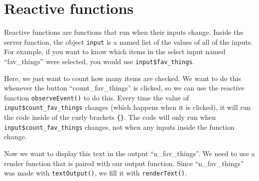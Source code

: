 \documentclass[
]{book}
\newenvironment{Shaded}{\begin{snugshade}}{\end{snugshade}}
\newcommand{\CommentTok}[1]{\textcolor[rgb]{0.56,0.35,0.01}{\textit{#1}}}
\newcommand{\ControlFlowTok}[1]{\textcolor[rgb]{0.13,0.29,0.53}{\textbf{#1}}}
\newcommand{\FunctionTok}[1]{\textcolor[rgb]{0.00,0.00,0.00}{#1}}
\newcommand{\NormalTok}[1]{#1}
\newcommand{\OtherTok}[1]{\textcolor[rgb]{0.56,0.35,0.01}{#1}}
\newcommand{\SpecialCharTok}[1]{\textcolor[rgb]{0.00,0.00,0.00}{#1}}
\newcommand{\StringTok}[1]{\textcolor[rgb]{0.31,0.60,0.02}{#1}}
\begin{document}
\hypertarget{first-reactive}{%
\section{Reactive functions}\label{first-reactive}}

Reactive functions are functions that run when their inputs change. Inside the server function, the object \texttt{input} is a named list of the values of all of the inputs. For example, if you want to know which items in the select input named ``fav\_things'' were selected, you would use \texttt{input\$fav\_things}.

Here, we just want to count how many items are checked. We want to do this whenever the button ``count\_fav\_things'' is clicked, so we can use the reactive function \texttt{observeEvent()} to do this. Every time the value of \texttt{input\$count\_fav\_things} changes (which happens when it is clicked), it will run the code inside of the curly brackets \texttt{\{\}}. The code will only run when \texttt{input\$count\_fav\_things} changes, not when any inputs inside the function change.

\begin{Shaded}
\end{Shaded}

Now we want to display this text in the output ``n\_fav\_things''. We need to use a render function that is paired with our output function. Since ``n\_fav\_things'' was made with \texttt{textOutput()}, we fill it with \texttt{renderText()}.

\begin{Shaded}
\end{Shaded}
\end{document}
